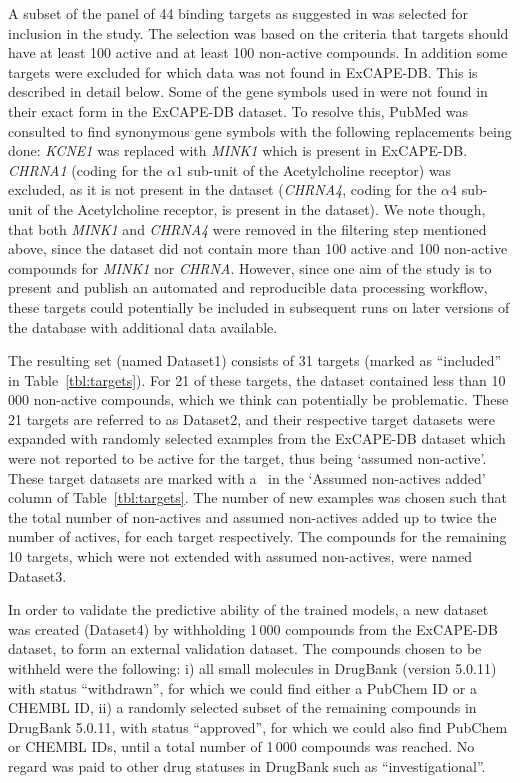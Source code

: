 \documentclass[utf8]{frontiersSCNS} %
\begin{document}
A subset of the panel of 44 binding targets as suggested in \cite{Bowes2012}
was selected for inclusion in the study. The selection was based on the
criteria that targets should have at least 100 active and at least 100
non-active compounds.  In addition some targets were excluded for which data
was not found in ExCAPE-DB. This is described in detail below.
%
Some of the gene symbols used in \cite{Bowes2012} were not found in their exact
form in the ExCAPE-DB dataset. To resolve this, PubMed was consulted to find
synonymous gene symbols with the following replacements being done:
%
\textit{KCNE1} was replaced with \textit{MINK1} which is present in ExCAPE-DB.
\textit{CHRNA1} (coding for the $\alpha1$ sub-unit of the Acetylcholine
receptor) was excluded, as it is not present in the dataset (\textit{CHRNA4},
coding for the $\alpha4$ sub-unit of the Acetylcholine receptor, is present in
the dataset). We note though, that both \textit{MINK1} and \textit{CHRNA4} were removed
in the filtering step mentioned above, since the dataset did not contain more
than 100 active and 100 non-active compounds for \textit{MINK1} nor
\textit{CHRNA}.  However, since one aim of the study is to present and publish
an automated and reproducible data processing workflow, these targets could
potentially be included in subsequent runs on later versions of the database
with additional data available.

The resulting set (named Dataset1) consists of 31 targets (marked as
``included'' in Table~\ref{tbl:targets}). For 21 of these targets, the
dataset contained less than 10\,000 non-active compounds, which we think can
potentially be problematic. These 21 targets are referred to as Dataset2, and
their respective target datasets were expanded with randomly selected
examples from the ExCAPE-DB dataset which were not reported to be active for
the target, thus being `assumed non-active'. These target datasets are marked
with a \checkmark\ in the `Assumed non-actives added' column of
Table~\ref{tbl:targets}. The number of new examples was chosen such that the
total number of non-actives and assumed non-actives added up to twice the
number of actives, for each target respectively. The compounds for the
remaining 10 targets, which were not extended with assumed non-actives, were
named Dataset3.

In order to validate the predictive ability of the trained models, a new
dataset was created (Dataset4) by withholding 1\,000 compounds from the
ExCAPE-DB dataset, to form an external validation dataset. The compounds chosen
to be withheld were the following: i) all small molecules in DrugBank (version
5.0.11) with status ``withdrawn'', for which we could find either a PubChem ID
or a CHEMBL ID, ii) a randomly selected subset of the remaining compounds in
DrugBank 5.0.11, with status ``approved'', for which we could also find PubChem
or CHEMBL IDs, until a total number of 1\,000 compounds was reached.  No regard
was paid to other drug statuses in DrugBank such as ``investigational''.
\end{document}
